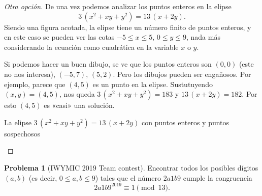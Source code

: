 \documentclass{article}
\theoremstyle{definition}
\newtheorem{problema}{Problema}
\begin{document}
\ifdefined\solutions\begin{proof}[Otra opción]
  De una vez podemos analizar los puntos enteros en la elipse
  $$3\,(x^2 + xy + y^2) = 13\,(x+2y).$$
  Siendo una figura acotada, la elipse tiene un número finito de puntos enteros,
  y en este caso se pueden ver las cotas $-5 \le x \le 5$, $0 \le y \le 9$, nada
  más considerando la ecuación como cuadrática en la variable $x$ o $y$.

  \pagebreak

  Si podemos hacer un buen dibujo, se ve que los puntos enteros son $(0,0)$
  (este no nos interesa), $(-5,7)$, $(5,2)$. Pero los dibujos pueden ser
  engañosos. Por ejemplo, parece que $(4,5)$ es un punto en la
  elipse. Sustutuyendo $(x,y) = (4,5)$, nos queda $3\,(x^2 + xy + y^2) = 183$ y
  $13\,(x+2y) = 182$. Por esto $(4,5)$ es «casi» una solución.

  \begin{center}

      La elipse $3\,(x^2 + xy + y^2) = 13\,(x+2y)$ con puntos enteros y puntos
      sospechosos
    \end{center}
\end{proof}\fi

\begin{problema}[IWYMIC 2019 Team contest]
  Encontrar todos los posibles dígitos $(a,b)$ (es decir, $0 \le a, b \le 9$)
  tales que el número $2a1b9$ cumple la congruencia
  $$2a1b9^{2019} \equiv 1 \pmod{13}.$$
\end{problema}
\end{document}
